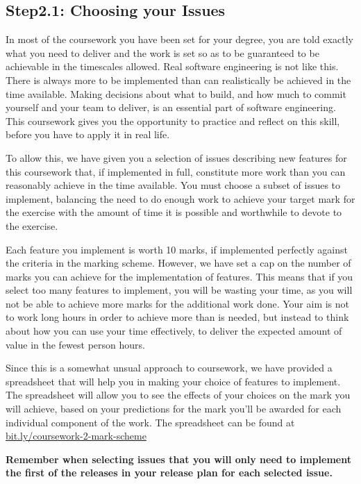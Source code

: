 \documentclass[
]{book}
\begin{document}
\hypertarget{ischoose}{%
\subsection{Step2.1: Choosing your Issues}\label{ischoose}}

In most of the coursework you have been set for your degree, you are told exactly what you need to deliver and the work is set so as to be guaranteed to be achievable in the timescales allowed. Real software engineering is not like this. There is always more to be implemented than can realistically be achieved in the time available. Making decisions about what to build, and how much to commit yourself and your team to deliver, is an essential part of software engineering. This coursework gives you the opportunity to practice and reflect on this skill, before you have to apply it in real life.

To allow this, we have given you a selection of issues describing new features for this coursework that, if implemented in full, constitute more work than you can reasonably achieve in the time available. You must choose a subset of issues to implement, balancing the need to do enough work to achieve your target mark for the exercise with the amount of time it is possible and worthwhile to devote to the exercise.

Each feature you implement is worth 10 marks, if implemented perfectly against the criteria in the marking scheme. However, we have set a cap on the number of marks you can achieve for the implementation of features. This means that if you select too many features to implement, you will be wasting your time, as you will not be able to achieve more marks for the additional work done. Your aim is not to work long hours in order to achieve more than is needed, but instead to think about how you can use your time effectively, to deliver the expected amount of value in the fewest person hours.

Since this is a somewhat unsual approach to coursework, we have provided a spreadsheet that will help you in making your choice of features to implement. The spreadsheet will allow you to see the effects of your choices on the mark you will achieve, based on your predictions for the mark you'll be awarded for each individual component of the work. The spreadsheet can be found at \href{https://bit.ly/coursework-2-mark-scheme}{bit.ly/coursework-2-mark-scheme}

\textbf{Remember when selecting issues that you will only need to implement the first of the releases in your release plan for each selected issue.}
\end{document}
